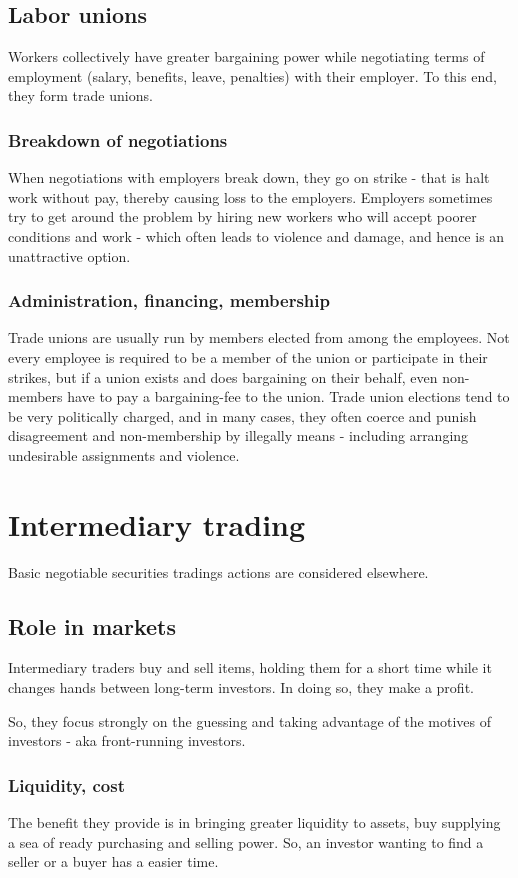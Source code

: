 \documentclass[oneside, article]{memoir}
\begin{document}
\section{Labor unions}
Workers collectively have greater bargaining power while negotiating terms of employment (salary, benefits, leave, penalties) with their employer. To this end, they form trade unions.

\subsection{Breakdown of negotiations}
When negotiations with employers break down, they go on strike - that is halt work without pay, thereby causing loss to the employers. Employers sometimes try to get around the problem by hiring new workers who will accept poorer conditions and work - which often leads to violence and damage, and hence is an unattractive option.

\subsection{Administration, financing, membership}
Trade unions are usually run by members elected from among the employees. Not every employee is required to be a member of the union or participate in their strikes, but if a union exists and does bargaining on their behalf, even non-members have to pay a bargaining-fee to the union. Trade union elections tend to be very politically charged, and in many cases, they often coerce and punish disagreement and non-membership by illegally means - including arranging undesirable assignments and violence.

\chapter{Intermediary trading}
Basic negotiable securities tradings actions are considered elsewhere.

\section{Role in markets}
Intermediary traders buy and sell items, holding them for a short time while it changes hands between long-term investors. In doing so, they make a profit.

So, they focus strongly on the guessing and taking advantage of the motives of investors - aka front-running investors.

\subsection{Liquidity, cost}
The benefit they provide is in bringing greater liquidity to assets, buy supplying a sea of ready purchasing and selling power. So, an investor wanting to find a seller or a buyer has a easier time.
\end{document}
